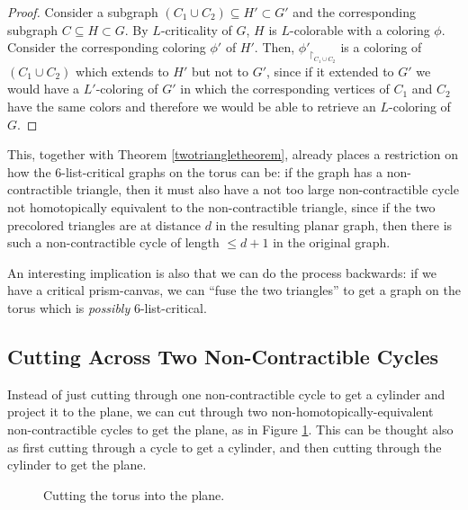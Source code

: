 \begin{proof}
Consider a subgraph $(C_1 \cup C_2) \subseteq H' \subset G'$ and
the corresponding subgraph $C \subseteq H \subset G$. 
By $L$-criticality of $G$, $H$ is $L$-colorable with a coloring $\phi$.
Consider the corresponding coloring $\phi'$ of $H'$.
 Then, $\phi'_{\restriction_{C_1 \cup C_2}}$
is a coloring of $(C_1 \cup C_2)$ which extends to $H'$ but not to $G'$, since if it extended
to $G'$ we would have a $L'$-coloring of $G'$ in which the corresponding vertices of $C_1$ and
$C_2$ have the same colors and therefore we would be able to retrieve an $L$-coloring of $G$.
\end{proof}

This, together with Theorem \ref{twotriangletheorem}, already places a restriction on how the
$6$-list-critical graphs on the torus can be: if the graph has a non-contractible triangle, then
it must also have a not too large non-contractible cycle not homotopically equivalent to 
the non-contractible triangle, since if the two precolored triangles are at distance $d$ in the
resulting planar graph, then there is such a non-contractible cycle of length $\leq d+1$ in the
original graph. 

An interesting implication is also that we can do the process backwards: if we have a critical 
prism-canvas, we can ``fuse the two triangles'' to get a graph on the torus which is 
\emph{possibly} $6$-list-critical.   

\subsection{Cutting Across Two Non-Contractible Cycles}

Instead of just cutting through one non-contractible cycle to get a cylinder and project it to the
plane, we can cut through two non-homotopically-equivalent non-contractible cycles to get the 
plane, as in Figure \ref{fig:twocycles_illustration}. This can be thought also as first cutting 
through a cycle to get a cylinder, and then cutting through the cylinder to get the plane. 

\begin{figure}
\label{fig:twocycles_illustration}
\centering
{}
\caption{Cutting the torus into the plane.}
\end{figure}

